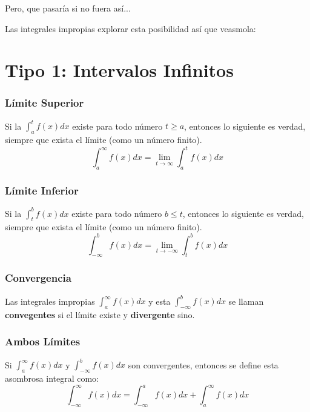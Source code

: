 \documentclass[12pt, fleqn]{report}                             %
\theoremstyle{break}                                            %
\begin{document}
            Pero, que pasaría si no fuera así...

            Las integrales impropias explorar esta posibilidad así que veasmola:

        \clearpage
        \section{Tipo 1: Intervalos Infinitos}

            \subsubsection{Límite Superior}
            Si la $\int_a^t f(x) dx$ existe para todo número $t \geq a$, entonces
            lo siguiente es verdad, siempre que exista el límite (como un número finito).
            \begin{equation}
                \int_a^{\infty} f(x) dx = \lim_{t \to \infty} \int_a^t f(x) dx
            \end{equation}

            \subsubsection{Límite Inferior}
            Si la $\int_t^b f(x) dx$ existe para todo número $b \leq t$, entonces lo
            siguiente es verdad, siempre que exista el límite (como un número finito).
            \begin{equation}
                \int_{- \infty}^b f(x) dx = \lim_{t \to - \infty} \int_t^b f(x) dx
            \end{equation}

            \subsubsection{Convergencia}
            Las integrales impropias $\int_a^{\infty}f(x)dx$ y esta $\int_{-\infty}^bf(x)dx$
            se llaman \textbf{convegentes} si el límite existe y  \textbf{divergente} sino.

            \subsubsection{Ambos Límites}
            Si $\int_a^{\infty}f(x)dx$ y $\int_{-\infty}^bf(x)dx$ son convergentes, entonces
            se define esta asombrosa integral como:
            \begin{equation}
                \int_{-\infty}^{\infty} f(x) dx = \int_{-\infty}^{a} f(x) dx + \int_{a}^{\infty} f(x) dx   
            \end{equation}
\end{document}
